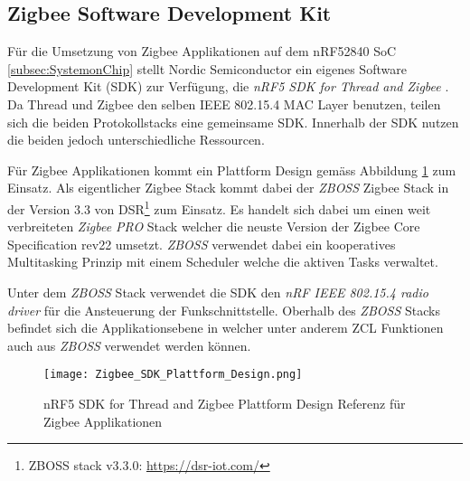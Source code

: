\subsection{Zigbee Software Development Kit}\label{subsec:ZigbeeSoftwareDevelopmentKit}

Für die Umsetzung von Zigbee Applikationen auf dem nRF52840 SoC \ref{subsec:SystemonChip} stellt Nordic Semiconductor ein eigenes Software Development Kit (SDK) zur Verfügung, die \textit{nRF5 SDK for Thread and Zigbee} \cite{nordic_semi_nrf_sdk_for_thread_and_zigbee_2020}.
Da Thread und Zigbee den selben IEEE 802.15.4 MAC Layer benutzen, teilen sich die beiden Protokollstacks eine gemeinsame SDK.
Innerhalb der SDK nutzen die beiden jedoch unterschiedliche Ressourcen.

Für Zigbee Applikationen kommt ein Plattform Design gemäss Abbildung \ref{fig:ZigbeePlattformDesign} zum Einsatz. 
Als eigentlicher Zigbee Stack kommt dabei der \textit{ZBOSS} Zigbee Stack in der Version 3.3 von DSR\footnote{ZBOSS stack v3.3.0: \url{https://dsr-iot.com/}} zum Einsatz.
Es handelt sich dabei um einen weit verbreiteten \textit{Zigbee PRO} Stack welcher die neuste Version der Zigbee Core Specification rev22 umsetzt.
\textit{ZBOSS} verwendet dabei ein kooperatives Multitasking Prinzip mit einem Scheduler welche die aktiven Tasks verwaltet.

Unter dem \textit{ZBOSS} Stack verwendet die SDK den \textit{nRF IEEE 802.15.4 radio driver} für die Ansteuerung der Funkschnittstelle.
Oberhalb des \textit{ZBOSS} Stacks befindet sich die Applikationsebene in welcher unter anderem ZCL Funktionen auch aus \textit{ZBOSS} verwendet werden können.


 
 \begin{figure}[h]
	\centering
	\texttt{[image: Zigbee\_SDK\_Plattform\_Design.png]}
	\caption{nRF5 SDK for Thread and Zigbee Plattform Design Referenz für Zigbee Applikationen \cite{nordic_semi_nrf_sdk_for_thread_and_zigbee_2020}}
	\label{fig:ZigbeePlattformDesign}
\end{figure}
 